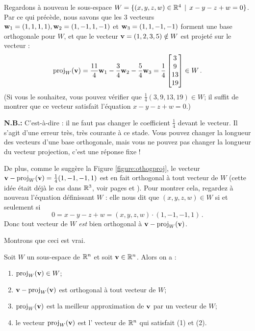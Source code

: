 \begin{myexample}
Regardons à nouveau le sous-espace $W=\{(x,y,z,w) \in \mathbb{R}^4 \, \mid \, x-y-z+w=0\}$. Par ce qui précède, nous savons que les 3 vecteurs $\mathbf{w}_1=(1,1,1,1), \mathbf{w}_2=(1,-1,1,-1)$ et $ \mathbf{w}_3=(1,1,-1,-1)$ forment une base orthogonale pour $W$, et que le vecteur $\mathbf{v} = (1,2,3,5) \notin W$ est projeté sur le vecteur :
$$
\operatorname{proj}_W(\mathbf{v}) = \frac{11}4\mathbf{w}_1 - \frac34\mathbf{w}_2 - \frac{5}{4}\mathbf{w}_3=\frac14\left[ \begin{matrix} 3\\ 9\\ 13\\ 19 \end{matrix} \right]\in W\,.
$$
(Si vous le souhaitez, vous pouvez vérifier que $\frac14(3, 9, 13, 19)\in W$; il suffit de montrer que ce vecteur satisfait l'équation $x-y-z+w=0$.)

{\bf N.B.:}  C'est-à-dire : il ne faut pas changer le coefficient $\frac14$ devant le vecteur. Il s'agit d'une erreur très, très courante à ce stade. Vous pouvez changer la longueur des vecteurs d'une base orthogonale, mais vous ne pouvez pas changer la longueur du vecteur projection, c'est une réponse fixe !

De plus, comme le suggère la Figure \ref{figure:othogproj},
le vecteur $\mathbf{v}-\operatorname{proj}_W(\mathbf{v})=\frac14(1, -1, -1, 1)$ est en fait orthogonal à tout vecteur de $W$ (cette idée était déjà le cas dans $\mathbb{R}^3$, voir pages \pageref{propOrthogProj} et \pageref{orthoprojonvector}). Pour montrer cela, regardez à nouveau l'équation définissant $W$ : elle nous dit que $(x,y,z,w) \in W$ si et seulement si 
$$ 0=x-y-z+w=(x,y,z,w)\cdot(1, -1, -1, 1)\,.$$ Donc tout vecteur de $W$ {\it est} bien orthogonal à $\mathbf{v}-\operatorname{proj}_W(\mathbf{v})$.
\end{myexample}


Montrons que ceci est vrai.
\begin{theorem} \label{orthogproj}
Soit $W$ un sous-espace de $\mathbb{R}^n$ et soit $\mathbf{v} \in \mathbb{R}^n$. Alors on a :

\begin{enumerate}[(1)]
\item $\operatorname{proj}_W(\mathbf{v}) \in W$;
\item $\mathbf{v} - \operatorname{proj}_W(\mathbf{v})$ est orthogonal \`a tout vecteur de $W$;
\item $\operatorname{proj}_W(\mathbf{v})$ est la meilleur approximation de $\mathbf{v}$ par un vecteur de $W$;
\item le vecteur $\operatorname{proj}_W(\mathbf{v})$ est l' vecteur de $\mathbb{R}^n$ qui satisfait (1) et (2).
\end{enumerate} 

\end{theorem}



